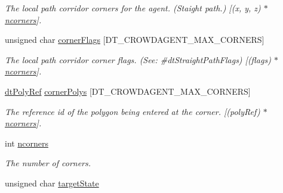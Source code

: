 \begin{DoxyCompactItemize}
\begin{DoxyCompactList}\small\item\em The local path corridor corners for the agent. (Staight path.) \mbox{[}(x, y, z) $\ast$ \hyperlink{structdtCrowdAgent_a74e6935a70f5a787f9e06481d9c2905b}{ncorners}\mbox{]}. \end{DoxyCompactList}\item 
\mbox{\label{structdtCrowdAgent_a1a39ad4f8255f65ca8ef3da1cdd3a48e}} 
unsigned char \hyperlink{structdtCrowdAgent_a1a39ad4f8255f65ca8ef3da1cdd3a48e}{corner\+Flags} \mbox{[}D\+T\+\_\+\+C\+R\+O\+W\+D\+A\+G\+E\+N\+T\+\_\+\+M\+A\+X\+\_\+\+C\+O\+R\+N\+E\+RS\mbox{]}
\begin{DoxyCompactList}\small\item\em The local path corridor corner flags. (See\+: \#dt\+Straight\+Path\+Flags) \mbox{[}(flags) $\ast$ \hyperlink{structdtCrowdAgent_a74e6935a70f5a787f9e06481d9c2905b}{ncorners}\mbox{]}. \end{DoxyCompactList}\item 
\mbox{\label{structdtCrowdAgent_a713759e845ecc9f1b361b9ae1399bf8e}} 
\hyperlink{group__detour_gab4e0b2257a670c1a800057999612b466}{dt\+Poly\+Ref} \hyperlink{structdtCrowdAgent_a713759e845ecc9f1b361b9ae1399bf8e}{corner\+Polys} \mbox{[}D\+T\+\_\+\+C\+R\+O\+W\+D\+A\+G\+E\+N\+T\+\_\+\+M\+A\+X\+\_\+\+C\+O\+R\+N\+E\+RS\mbox{]}
\begin{DoxyCompactList}\small\item\em The reference id of the polygon being entered at the corner. \mbox{[}(poly\+Ref) $\ast$ \hyperlink{structdtCrowdAgent_a74e6935a70f5a787f9e06481d9c2905b}{ncorners}\mbox{]}. \end{DoxyCompactList}\item 
\mbox{\label{structdtCrowdAgent_a74e6935a70f5a787f9e06481d9c2905b}} 
int \hyperlink{structdtCrowdAgent_a74e6935a70f5a787f9e06481d9c2905b}{ncorners}
\begin{DoxyCompactList}\small\item\em The number of corners. \end{DoxyCompactList}\item 
\mbox{\label{structdtCrowdAgent_a221a6da715a7e67bbe39e8263ed39948}} 
unsigned char \hyperlink{structdtCrowdAgent_a221a6da715a7e67bbe39e8263ed39948}{target\+State}

\end{DoxyCompactItemize}
